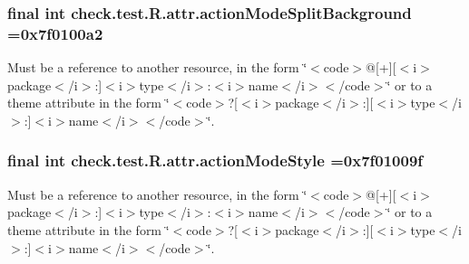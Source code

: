\subsubsection[{action\+Mode\+Split\+Background}]{\setlength{\rightskip}{0pt plus 5cm}final int check.\+test.\+R.\+attr.\+action\+Mode\+Split\+Background =0x7f0100a2\hspace{0.3cm}{\ttfamily [static]}}\label{classcheck_1_1test_1_1_r_1_1attr_ab54b0e4c2777d73f47b3f7d655ecc84e}
Must be a reference to another resource, in the form \char`\"{}$<$code$>$@\mbox{[}+\mbox{]}\mbox{[}$<$i$>$package$<$/i$>$\+:\mbox{]}$<$i$>$type$<$/i$>$\+:$<$i$>$name$<$/i$>$$<$/code$>$\char`\"{} or to a theme attribute in the form \char`\"{}$<$code$>$?\mbox{[}$<$i$>$package$<$/i$>$\+:\mbox{]}\mbox{[}$<$i$>$type$<$/i$>$\+:\mbox{]}$<$i$>$name$<$/i$>$$<$/code$>$\char`\"{}. \hypertarget{classcheck_1_1test_1_1_r_1_1attr_a5b076a6be691781155b6fd38363e01aa}{}
\subsubsection[{action\+Mode\+Style}]{\setlength{\rightskip}{0pt plus 5cm}final int check.\+test.\+R.\+attr.\+action\+Mode\+Style =0x7f01009f\hspace{0.3cm}{\ttfamily [static]}}\label{classcheck_1_1test_1_1_r_1_1attr_a5b076a6be691781155b6fd38363e01aa}
Must be a reference to another resource, in the form \char`\"{}$<$code$>$@\mbox{[}+\mbox{]}\mbox{[}$<$i$>$package$<$/i$>$\+:\mbox{]}$<$i$>$type$<$/i$>$\+:$<$i$>$name$<$/i$>$$<$/code$>$\char`\"{} or to a theme attribute in the form \char`\"{}$<$code$>$?\mbox{[}$<$i$>$package$<$/i$>$\+:\mbox{]}\mbox{[}$<$i$>$type$<$/i$>$\+:\mbox{]}$<$i$>$name$<$/i$>$$<$/code$>$\char`\"{}. \hypertarget{classcheck_1_1test_1_1_r_1_1attr_afa8798d214b16417489dd4868015a948}{}
